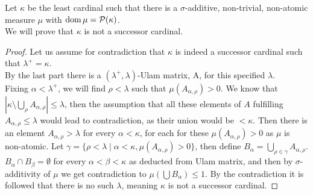 \subquestion{}
Let $\kappa$ be the least cardinal such that there is a $\sigma$-additive, non-trivial, non-atomic measure $\mu$ with $\operatorname{dom} \mu = \mathcal{P}(\kappa)$. \\
We will prove that $\kappa$ is not a successor cardinal.
\begin{proof}
	Let us assume for contradiction that $\kappa$ is indeed a successor cardinal such that $\lambda^+ = \kappa$. \\
	By the last part there is a $(\lambda^+, \lambda)$-Ulam matrix, A, for this specified $\lambda$. \\
	Fixing $\alpha < \lambda^+$, we will find $\rho < \lambda$ such that $\mu(A_{\alpha, \rho}) > 0$.
	We know that $|\kappa \setminus \bigcup_\rho A_{\alpha, \rho}| \le \lambda$,
	then the assumption that all these elements of $A$ fulfilling $A_{\alpha, \rho} \le \lambda$ would lead to contradiction, as their union would be $< \kappa$.
	Then there is an element $A_{\alpha, \rho} > \lambda$ for every $\alpha < \kappa$, for each for these $\mu(A_{\alpha, \rho}) > 0$ as $\mu$ is non-atomic.
	Let $\gamma = \{ \rho < \lambda \mid \alpha < \kappa, \mu(A_{\alpha, \rho}) > 0 \}$, then define $B_\alpha = \bigcup_{\rho \in \gamma} A_{\alpha, \rho}$.
	$B_\alpha \cap B_\beta = \emptyset$ for every $\alpha < \beta < \kappa$ as deducted from Ulam matrix, and then by $\sigma$-additivity of $\mu$ we get contradiction to $\mu(\bigcup B_\alpha) \le 1$.
	By the contradiction it is followed that there is no such $\lambda$, meaning $\kappa$ is not a successor cardinal.
\end{proof}

